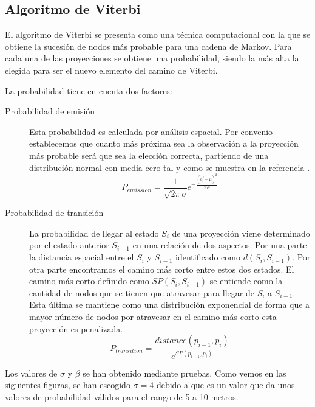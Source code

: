 \subsection{Algoritmo de Viterbi}
El algoritmo de Viterbi se presenta como una técnica computacional con la que se obtiene la sucesión de 
nodos más probable para una cadena de Markov. Para cada una de las proyecciones se obtiene una probabilidad, 
siendo la más alta la elegida para ser el nuevo elemento del camino de Viterbi.

La probabilidad tiene en cuenta dos factores:
\begin{description}
\item [Probabilidad de emisión] Esta probabilidad es calculada por análisis espacial. Por convenio establecemos 
que cuanto más próxima sea la observación a la proyección más probable será que sea la elección correcta, 
partiendo de una distribución normal con media cero tal y como se muestra en la referencia \cite{HMM01}.
\begin{equation}
P_{emission}=\frac{1}{\sqrt{2\pi}\sigma}e^{-\frac{(d_{i}^{j}-\mu)^{2}}{2\sigma^{2}}} 
\end{equation}

\item [Probabilidad de transición] La probabilidad de llegar al estado $S_{i}$ de una proyección viene 
determinado por el estado anterior $S_{i-1}$ en una relación de dos aspectos. Por una parte la distancia 
espacial entre el  $S_{i}$ y $S_{i-1}$ identificado como $d(S_{i},S_{i-1})$. Por otra parte encontramos el 
camino más corto entre estos dos estados. El camino más corto definido como $SP(S_{i},S_{i-1})$ se entiende 
como la cantidad de nodos que se tienen que atravesar para llegar de  $S_{i}$ a $S_{i-1}$. Esta última se mantiene 
como una distribución exponencial de forma que a mayor número de nodos por atravesar en el camino más 
corto esta proyección es penalizada.
\begin{equation} 
P_{transition}=\frac{distance(p_{i-1}, p_{i})}{e^{SP(p_{i-1}, p_{i})}}
\end{equation}
\end{description}

Los valores de $\sigma$ y $\beta$ se han obtenido mediante pruebas. Como vemos en las siguientes figuras,
se han escogido $\sigma = 4$ debido a que es un valor que da unos valores de probabilidad válidos para 
el rango de 5 a 10 metros. 

